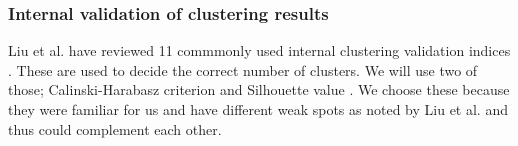% 






\subsubsection{Internal validation of clustering results}
Liu et al. have reviewed 11 commmonly used internal clustering 
validation indices \cite{liu_understanding_2010}. These are used 
to decide the correct number of clusters. We will use two 
of those; Calinski-Harabasz criterion \cite{calinski_dendrite_1974} 
and Silhouette value \cite{rousseeuw_silhouettes:_1987}. We choose 
these because they were familiar for us and have different
weak spots as noted by Liu et al. and thus could complement each 
other. 

